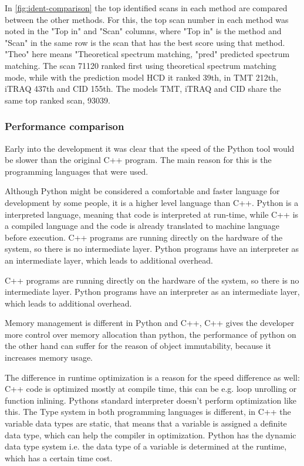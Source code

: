 \documentclass[11pt]{article}
\begin{document}
In \cref{fig:ident-comparison} the top identified scans in each method are compared between the other methods. For this, the top scan number in each method was noted in the "Top in" and "Scan" columns, where "Top in" is the method and "Scan" in the same row is the scan that has the best score using that method. "Theo" here means "Theoretical spectrum matching, "pred" predicted spectrum matching. 
The scan 71120 ranked first using theoretical spectrum matching mode, while with the prediction model HCD it ranked 39th, in TMT 212th, iTRAQ 437th and CID 155th. The models TMT, iTRAQ and CID share the same top ranked scan, 93039.

\subsubsection{Performance comparison}
Early into the development it was clear that the speed of the Python tool would be slower than the original C++ program. The main reason for this is the programming languages that were used. 

Although Python might be considered a comfortable and faster language for development by some people, it is a higher level language than C++. Python is a interpreted language, meaning that code is interpreted at run-time, while C++ is a compiled language and the code is already translated to machine language before execution. C++ programs are running directly on the hardware of the system, so there is no intermediate layer. Python programs have an interpreter as an intermediate layer, which leads to additional overhead.

C++ programs are running directly on the hardware of the system, so there is no intermediate layer. Python programs have an interpreter as an intermediate layer, which leads to additional overhead.

Memory management is different in Python and C++, C++ gives the developer more control over memory allocation than python, the performance of python on the other hand can suffer for the reason of object immutability, because it increases memory usage. 

The difference in runtime optimization is a reason for the speed difference as well: C++ code is optimized mostly at compile time, this can be e.g. loop unrolling or function inlining. Pythons standard interpreter doesn't perform optimization like this. The Type system in both programming languages is different, in C++ the variable data types are static, that means that a variable is assigned a definite data type, which can help the compiler in optimization. Python has the dynamic data type system i.e. the data type of a variable is determined at the runtime, which has a certain time cost.
\end{document}
